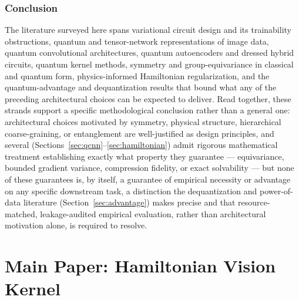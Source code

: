 \documentclass[11pt]{article}
\begin{document}
\section{Conclusion}
\label{sec:lr_conclusion}
The literature surveyed here spans variational circuit design and its trainability obstructions, quantum and tensor-network representations of image data, quantum convolutional architectures, quantum autoencoders and dressed hybrid circuits, quantum kernel methods, symmetry and group-equivariance in classical and quantum form, physics-informed Hamiltonian regularization, and the quantum-advantage and dequantization results that bound what any of the preceding architectural choices can be expected to deliver. Read together, these strands support a specific methodological conclusion rather than a general one: architectural choices motivated by symmetry, physical structure, hierarchical coarse-graining, or entanglement are well-justified as design principles, and several (Sections~\ref{sec:qcnn}--\ref{sec:hamiltonian}) admit rigorous mathematical treatment establishing exactly what property they guarantee — equivariance, bounded gradient variance, compression fidelity, or exact solvability — but none of these guarantees is, by itself, a guarantee of empirical necessity or advantage on any specific downstream task, a distinction the dequantization and power-of-data literature (Section~\ref{sec:advantage}) makes precise and that resource-matched, leakage-audited empirical evaluation, rather than architectural motivation alone, is required to resolve.



\part{Main Paper: Hamiltonian Vision Kernel}
\end{document}
